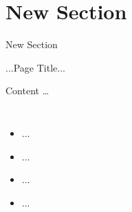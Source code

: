 \section{New Section}

\bottomline{}
\begin{frame}
\centering \Huge New Section
\end{frame}

{
\begin{frame}{...Page Title...}
\centering
\begin{block}{Content \ldots}
\vspace{3mm}
\begin{columns}
\centering
[...graphics...]
\begin{itemize}
\item ...
\item ...
\item ...
\item ...
\end{itemize}
\end{columns}
\vspace{3mm}
\end{block}
\end{frame}
}
